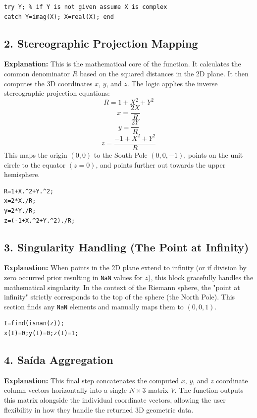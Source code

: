 \begin{lstlisting}[style=matlabstyle]
try Y; % if Y is not given assume X is complex
catch Y=imag(X); X=real(X); end
\end{lstlisting}

\subsection{2. Stereographic Projection Mapping}
\textbf{Explanation:} 
This is the mathematical core of the function. It calculates the common denominator $R$ based on the squared distances in the 2D plane. It then computes the 3D coordinates $x$, $y$, and $z$. The logic applies the inverse stereographic projection equations:
$$R=1+X^2+Y^2$$
$$x=\frac{2X}{R}$$
$$y=\frac{2Y}{R}$$
$$z=\frac{-1+X^2+Y^2}{R}$$
This maps the origin $(0,0)$ to the South Pole $(0,0,-1)$, points on the unit circle to the equator $(z=0)$, and points further out towards the upper hemisphere.

\begin{lstlisting}[style=matlabstyle]
R=1+X.^2+Y.^2;
x=2*X./R;
y=2*Y./R;
z=(-1+X.^2+Y.^2)./R;
\end{lstlisting}

\subsection{3. Singularity Handling (The Point at Infinity)}
\textbf{Explanation:} 
When points in the 2D plane extend to infinity (or if division by zero occurred prior resulting in \texttt{NaN} values for $z$), this block gracefully handles the mathematical singularity. In the context of the Riemann sphere, the "point at infinity" strictly corresponds to the top of the sphere (the North Pole). This section finds any \texttt{NaN} elements and manually maps them to $(0,0,1)$.

\begin{lstlisting}[style=matlabstyle]
I=find(isnan(z));
x(I)=0;y(I)=0;z(I)=1;
\end{lstlisting}

\subsection{4. Saída Aggregation}
\textbf{Explanation:} 
This final step concatenates the computed $x$, $y$, and $z$ coordinate column vectors horizontally into a single $N \times 3$ matrix $V$. The function outputs this matrix alongside the individual coordinate vectors, allowing the user flexibility in how they handle the returned 3D geometric data.

